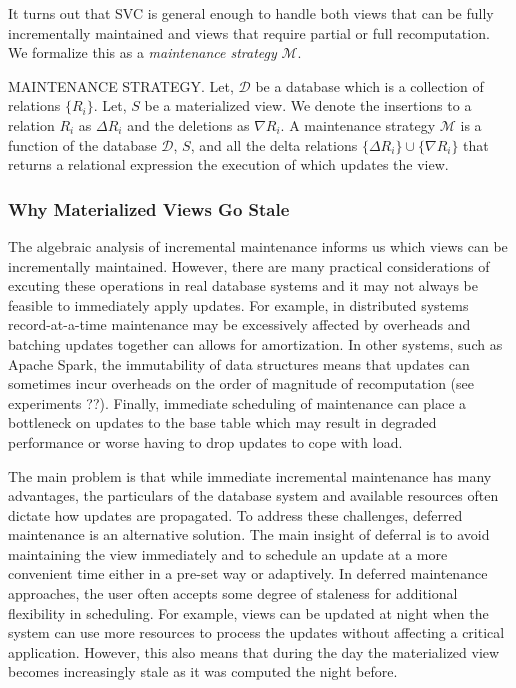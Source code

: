 It turns out that SVC is general enough to handle both views that can be fully incrementally maintained and views that require partial or full recomputation.
We formalize this as a \emph{maintenance strategy} $\mathcal{M}$.
\begin{definition} MAINTENANCE STRATEGY.
Let, $\mathcal{D}$ be a database which is a collection of relations $\{R_i\}$.
Let, $S$ be a materialized view.
We denote the insertions to a relation $R_i$ as $\Delta R_i$ and the deletions as $\nabla R_i$.
A maintenance strategy $\mathcal{M}$ is a function of the database $\mathcal{D}$, $S$, and all the delta relations $\{\Delta R_i\} \cup \{\nabla R_i\}$ that returns a relational expression the execution of which updates the view.
\end{definition}

\subsubsection{Why Materialized Views Go Stale}
The algebraic analysis of incremental maintenance informs us which views can be incrementally maintained.
However, there are many practical considerations of excuting these operations in real database systems and it may not always be feasible to immediately apply updates.
For example, in distributed systems record-at-a-time maintenance may be excessively affected by overheads and batching updates together can allows for amortization.
In other systems, such as Apache Spark, the immutability of data structures means that updates can sometimes incur overheads on the order of magnitude of recomputation (see experiments ??).
Finally, immediate scheduling of maintenance can place a bottleneck on updates to the base table which may result in degraded performance or worse having to drop updates to cope with load.

The main problem is that while immediate incremental maintenance has many advantages, the particulars of the database system and available resources often dictate how updates are propagated.
To address these challenges, deferred maintenance is an alternative solution.
The main insight of deferral is to avoid maintaining the view immediately and to schedule an update at a more convenient time either in a pre-set way or adaptively.
In deferred maintenance approaches, the user often accepts some degree of staleness for additional flexibility in scheduling.
For example, views can be updated at night when the system can use more resources to process the updates without affecting a critical application.
However, this also means that during the day the materialized view becomes increasingly stale as it was computed the night before.


